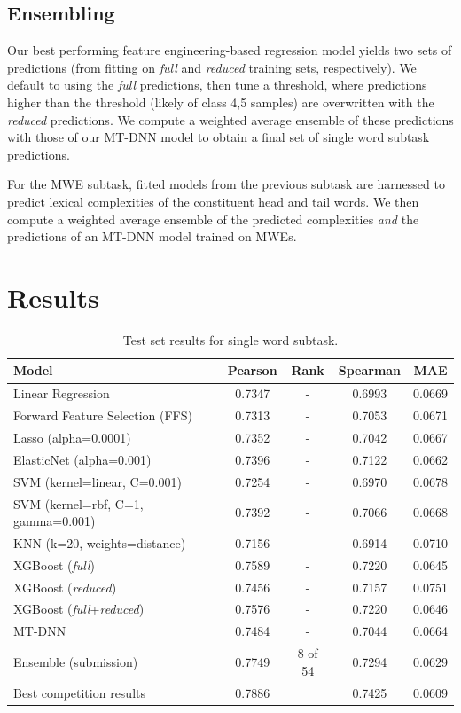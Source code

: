 \documentclass{dcthesis}
\theoremstyle{definition}
\theoremstyle{remark}
\begin{document}
\section{Ensembling}

Our best performing feature engineering-based regression model yields two sets of predictions (from fitting on \textit{full} and \textit{reduced} training sets, respectively). We default to using the \textit{full} predictions, then tune a threshold, where predictions higher than the threshold (likely of class 4,5 samples) are overwritten with the \textit{reduced} predictions. We compute a weighted average ensemble of these predictions with those of our MT-DNN model to obtain a final set of single word subtask predictions. 

For the MWE subtask, fitted models from the previous subtask are harnessed to predict lexical complexities of the constituent head and tail words. We then compute a weighted average ensemble of the predicted complexities \textit{and} the predictions of an MT-DNN model trained on MWEs.

\chapter{Results}

\begin{table}[t]
  \centering
  \begin{tabular}{lcccc}
  \hline \textbf{Model} & \textbf{Pearson} & \textbf{Rank} & \textbf{Spearman} & \textbf{MAE} \\ \hline
  Linear Regression	& 0.7347 & - &	0.6993 &	0.0669 \\
  Forward Feature Selection (FFS)	& 0.7313 & - &	0.7053 & 0.0671 \\
  Lasso (alpha=0.0001) &	0.7352 & - &	0.7042 & 	0.0667 \\
  ElasticNet (alpha=0.001) &	0.7396 & - &	0.7122 &	0.0662 \\
  SVM (kernel=linear, C=0.001) &	0.7254 & - &	0.6970 &	0.0678 \\
  SVM (kernel=rbf, C=1, gamma=0.001) &	0.7392 & - &	0.7066 &	0.0668 \\
  KNN (k=20, weights=distance) &	0.7156 & -	& 0.6914 &	0.0710 \\
  \hline
  XGBoost (\textit{full}) &	0.7589 & - &	0.7220 &	0.0645 \\
  XGBoost (\textit{reduced}) &	0.7456 & - &	0.7157 &	0.0751 \\
  XGBoost (\textit{full}+\textit{reduced}) & 0.7576 & - & 0.7220 & 0.0646 \\
  MT-DNN & 0.7484 & -	& 0.7044 & 0.0664 \\
  Ensemble (submission) & 0.7749 & 8 of 54 & 0.7294 & 0.0629 \\
  \hline
  Best competition results & 0.7886 & & 0.7425 & 0.0609 \\ 
  \hline
  \end{tabular}
  \caption{\label{tab:single-word-results} Test set results for single word subtask. }
\end{table}
\end{document}
